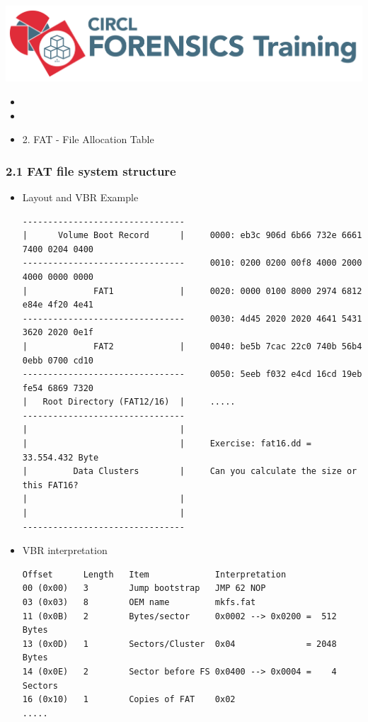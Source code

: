 %
%



\begin{frame}
    \includegraphics[scale=0.3]{images/logo-circl-Forensics.png}
    \begin{itemize}
        \item[]
        \item[]
        \item[] 2. FAT - File Allocation Table
    \end{itemize}
\end{frame}


\begin{frame}[fragile]
  \frametitle{2.1 FAT file system structure}
    \begin{itemize}
	    \item Layout and VBR Example
  \begin{lstlisting}[basicstyle=\tiny]
--------------------------------
|      Volume Boot Record      |     0000: eb3c 906d 6b66 732e 6661 7400 0204 0400
--------------------------------     0010: 0200 0200 00f8 4000 2000 4000 0000 0000
|             FAT1             |     0020: 0000 0100 8000 2974 6812 e84e 4f20 4e41
--------------------------------     0030: 4d45 2020 2020 4641 5431 3620 2020 0e1f
|             FAT2             |     0040: be5b 7cac 22c0 740b 56b4 0ebb 0700 cd10
--------------------------------     0050: 5eeb f032 e4cd 16cd 19eb fe54 6869 7320
|   Root Directory (FAT12/16)  |     .....
--------------------------------
|                              |
|                              |     Exercise: fat16.dd = 33.554.432 Byte
|         Data Clusters        |     Can you calculate the size or this FAT16?
|                              |
|                              | 
--------------------------------
  \end{lstlisting}
	    \item VBR interpretation
  \begin{lstlisting}[basicstyle=\tiny]
Offset      Length   Item             Interpretation
00 (0x00)   3        Jump bootstrap   JMP 62 NOP
03 (0x03)   8        OEM name         mkfs.fat
11 (0x0B)   2        Bytes/sector     0x0002 --> 0x0200 =  512 Bytes
13 (0x0D)   1        Sectors/Cluster  0x04              = 2048 Bytes
14 (0x0E)   2        Sector before FS 0x0400 --> 0x0004 =    4 Sectors
16 (0x10)   1        Copies of FAT    0x02
.....
  \end{lstlisting}
    \end{itemize}
\end{frame}


